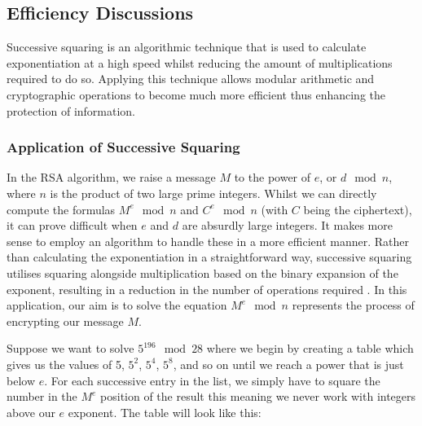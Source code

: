 \documentclass{article}
\begin{document}
\subsection{Efficiency Discussions}
Successive squaring is an algorithmic technique that is used to calculate exponentiation at a high speed whilst reducing the amount of multiplications required to do so. Applying this technique allows modular arithmetic and cryptographic operations to become much more efficient thus enhancing the protection of information. 

\subsubsection{Application of Successive Squaring}
In the RSA algorithm, we raise a message $M$ to the power of $e$, or $d \mod n$, where $n$ is the product of two large prime integers. Whilst we can directly compute the formulas $M^e \mod n$ and $C^e \mod n$ (with $C$ being the ciphertext), it can prove difficult when $e$ and $d$ are absurdly large integers. It makes more sense to employ an algorithm to handle these in a more efficient manner. Rather than calculating the exponentiation in a straightforward way, successive squaring utilises squaring alongside multiplication based on the binary expansion of the exponent, resulting in a reduction in the number of operations required \cite{successive}. In this application, our aim is to solve the equation $M^e \mod n$ represents the process of encrypting our message $M$.

Suppose we want to solve $5^{196} \mod 28$ where we begin by creating a table which gives us the values of 5, $5^2$, $5^4$, $5^8$, and so on until we reach a power that is just below $e$. For each successive entry in the list, we simply have to square the number in the $M^e$ position of the result this meaning we never work with integers above our $e$ exponent. The table will look like this:
\end{document}
